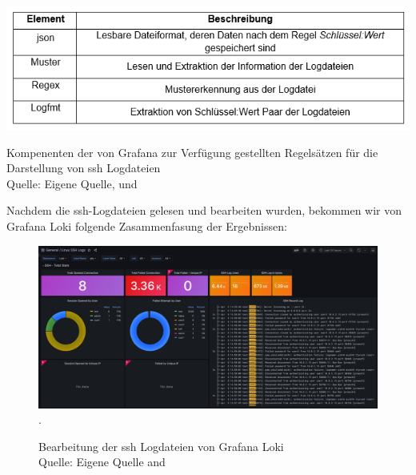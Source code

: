 \begin{table}[H]
   \includegraphics[width=\linewidth]{assets/tabelle_sshgrafana.png}
   \caption{Kompenenten der von Grafana zur Verfügung gestellten Regelsätzen für die Darstellung von \gls{ssh} Logdateien  \\Quelle: Eigene Quelle, \citep{VoidQuark_sshlogs} und \citep{Setter_Logfmt}}
\end{table}

\newpage
\thispagestyle{lscape}
\begin{landscape}
   Nachdem die \gls{ssh}-Logdateien gelesen und bearbeiten wurden, bekommen wir von Grafana Loki folgende Zasammenfasung der Ergebnissen:
   \begin{center}
      \begin{figure}[H]
         \centering
         \includegraphics[width=1.3\textwidth]{assets/GrafanaLoki_ssh.png}.
         \caption{Bearbeitung der \gls{ssh} Logdateien von Grafana Loki\\Quelle: Eigene Quelle and \citep{VoidQuark_sshlogs}}
         \centering
      \end{figure}
   \end{center}
\end{landscape}

